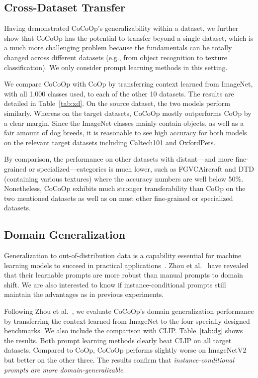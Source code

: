 \documentclass[10pt,twocolumn,letterpaper]{article}
\begin{document}
\subsection{Cross-Dataset Transfer}
\label{sec:experiments;subsec:transfer_crossdatasets}

Having demonstrated CoCoOp's generalizability within a dataset, we further show that CoCoOp has the potential to transfer beyond a single dataset, which is a much more challenging problem because the fundamentals can be totally changed across different datasets (e.g., from object recognition to texture classification). We only consider prompt learning methods in this setting.

We compare CoCoOp with CoOp by transferring context learned from ImageNet, with all 1,000 classes used, to each of the other 10 datasets. The results are detailed in Table~\ref{tab:xd}. On the source dataset, the two models perform similarly. Whereas on the target datasets, CoCoOp mostly outperforms CoOp by a clear margin. Since the ImageNet classes mainly contain objects, as well as a fair amount of dog breeds, it is reasonable to see high accuracy for both models on the relevant target datasets including Caltech101 and OxfordPets. 

By comparison, the performance on other datasets with distant---and more fine-grained or specialized---categories is much lower, such as FGVCAircraft and DTD (containing various textures) where the accuracy numbers are well below 50\%. Nonetheless, CoCoOp exhibits much stronger transferability than CoOp on the two mentioned datasets as well as on most other fine-grained or specialized datasets.


\subsection{Domain Generalization}
\label{sec:experiments;subsec:dg}

Generalization to out-of-distribution data is a capability essential for machine learning models to succeed in practical applications~\cite{taori2020measuring,zhou2021domain}. Zhou et al.~\cite{zhou2021coop} have revealed that their learnable prompts are more robust than manual prompts to domain shift. We are also interested to know if instance-conditional prompts still maintain the advantages as in previous experiments.

Following Zhou et al.~\cite{zhou2021coop}, we evaluate CoCoOp's domain generalization performance by transferring the context learned from ImageNet to the four specially designed benchmarks. We also include the comparison with CLIP.
%
Table~\ref{tab:dg} shows the results. Both prompt learning methods clearly beat CLIP on all target datasets. Compared to CoOp, CoCoOp performs slightly worse on ImageNetV2 but better on the other three. The results confirm that \emph{instance-conditional prompts are more domain-generalizable}.
\end{document}
